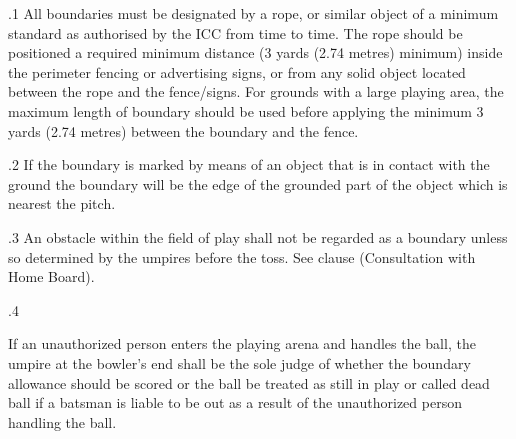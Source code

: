 \documentclass[12pt]{article}
\begin{document}
\vspace{\baselineskip}
\begin{adjustwidth}{0.5in}{0.03in}
{\fontsize{9pt}{10.8pt}.1 \tabto{0.49in} All boundaries must be designated by a rope, or similar object of a minimum standard as authorised by the ICC from time to time. The rope should be positioned a required minimum distance (3 yards (2.74 metres) minimum) inside the perimeter fencing or advertising signs, or from any solid object located between the rope and the fence/signs. For grounds with a large playing area, the maximum length of boundary should be used before applying the minimum 3 yards (2.74 metres) between the boundary and the fence.\par}\par

\end{adjustwidth}


\vspace{\baselineskip}
\begin{adjustwidth}{0.5in}{0.15in}
{\fontsize{9pt}{10.8pt}.2 \tabto{0.49in} If the boundary is marked by means of an object that is in contact with the ground the boundary will be the edge of the grounded part of the object which is nearest the pitch.\par}\par

\end{adjustwidth}


\vspace{\baselineskip}
\begin{adjustwidth}{0.5in}{0.0in}
{\fontsize{9pt}{10.8pt}.3 \tabto{0.49in} An obstacle within the field of play shall not be regarded as a boundary unless so determined by the umpires before the toss. See clause (Consultation with Home Board).\par}\par

\end{adjustwidth}


\vspace{\baselineskip}
\begin{adjustwidth}{0.5in}{0.03in}
{\fontsize{9pt}{10.8pt}.4 \tabto{0.49in} {\fontsize{8pt}{9.6pt}\selectfont If an unauthorized person enters the playing arena and handles the ball, the umpire at the bowler’s end shall be the sole judge of whether the boundary allowance should be scored or the ball be treated as still in play or called dead ball if a batsman is liable to be out as a result of the unauthorized person handling the ball.\par}\par}\par

\end{adjustwidth}
\end{document}
